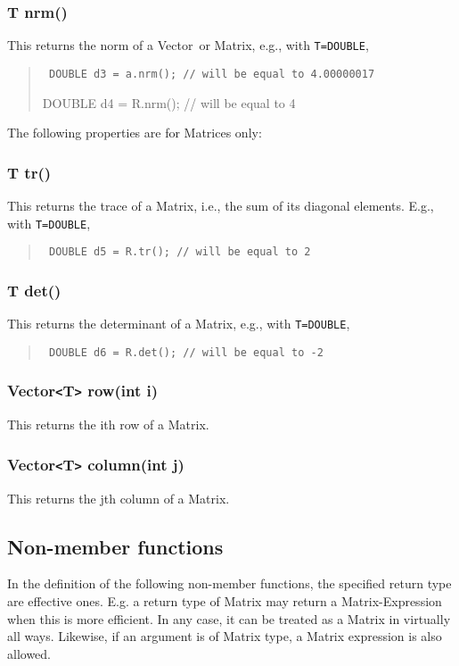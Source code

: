 \documentclass[12pt,twoside]{article}
\newcommand{\Vector}{{Vector}}
\newcommand{\Matrix}{{Matrix}}
\newcommand{\TT}{{\tt<}T{\tt>}}
\begin{document}
\subsubsection{T nrm()}

This returns the norm of a \Vector\ or \Matrix, e.g., with {\tt T=DOUBLE},
\begin{quote} \tt
  DOUBLE d3 = a.nrm(); // will be equal to 4.00000017

  DOUBLE d4 = R.nrm(); // will be equal to 4
\end{quote}

\noindent
The following properties are for Matrices only:

\subsubsection{T tr()}

This returns the trace of a \Matrix, i.e., the sum of its diagonal
elements. E.g., with {\tt T=DOUBLE},
\begin{quote} \tt
  DOUBLE d5 = R.tr(); // will be equal to 2
\end{quote}

\subsubsection{T det()}

This returns the determinant of a \Matrix, e.g., with {\tt T=DOUBLE},
\begin{quote} \tt
  DOUBLE d6 = R.det(); // will be equal to -2
\end{quote}

\subsubsection{Vector\TT{} row(int i)}
This returns the ith row of a \Matrix.

\subsubsection{Vector\TT{} column(int j)}

This returns the jth column of a \Matrix.

\pagebreak[3]
\subsection{Non-member functions}

In the definition of the following non-member functions, the specified
return type are effective ones. E.g. a return type of Matrix may
return a Matrix-Expression when this is more efficient. In any case, it
can be treated as a Matrix in virtually all ways. Likewise, if an
argument is of Matrix type, a Matrix expression is also allowed.
\end{document}
